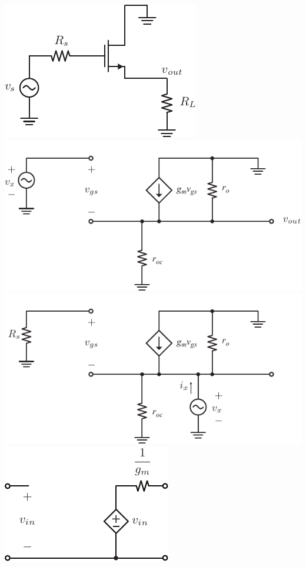 \includegraphics[width=.75\columnwidth]{cd_amp_ac}
\includegraphics[width=.75\columnwidth]{cd_amp_ss_av}
\includegraphics[width=.75\columnwidth]{cd_amp_ss_rout}
\includegraphics[width=.75\columnwidth]{cd_amp_model}


